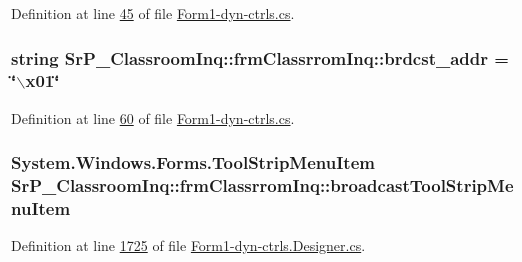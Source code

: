 \-Definition at line \hyperlink{_form1-dyn-ctrls_8cs_source_l00045}{45} of file \hyperlink{_form1-dyn-ctrls_8cs_source}{\-Form1-\/dyn-\/ctrls.\-cs}.

\hypertarget{class_sr_p___classroom_inq_1_1frm_classrrom_inq_a1d96e40e37aca536a94b7107df4a2d71}{
\subsubsection[{brdcst\-\_\-addr}]{\setlength{\rightskip}{0pt plus 5cm}string {\bf \-Sr\-P\-\_\-\-Classroom\-Inq\-::frm\-Classrrom\-Inq\-::brdcst\-\_\-addr} = \char`\"{}$\backslash$x01\char`\"{}}}
\label{class_sr_p___classroom_inq_1_1frm_classrrom_inq_a1d96e40e37aca536a94b7107df4a2d71}


\-Definition at line \hyperlink{_form1-dyn-ctrls_8cs_source_l00060}{60} of file \hyperlink{_form1-dyn-ctrls_8cs_source}{\-Form1-\/dyn-\/ctrls.\-cs}.

\hypertarget{class_sr_p___classroom_inq_1_1frm_classrrom_inq_ac34894d134f025ca6e53b41c744bcf8e}{
\subsubsection[{broadcast\-Tool\-Strip\-Menu\-Item}]{\setlength{\rightskip}{0pt plus 5cm}\-System.\-Windows.\-Forms.\-Tool\-Strip\-Menu\-Item {\bf \-Sr\-P\-\_\-\-Classroom\-Inq\-::frm\-Classrrom\-Inq\-::broadcast\-Tool\-Strip\-Menu\-Item}}}
\label{class_sr_p___classroom_inq_1_1frm_classrrom_inq_ac34894d134f025ca6e53b41c744bcf8e}


\-Definition at line \hyperlink{_form1-dyn-ctrls_8_designer_8cs_source_l01725}{1725} of file \hyperlink{_form1-dyn-ctrls_8_designer_8cs_source}{\-Form1-\/dyn-\/ctrls.\-Designer.\-cs}.

